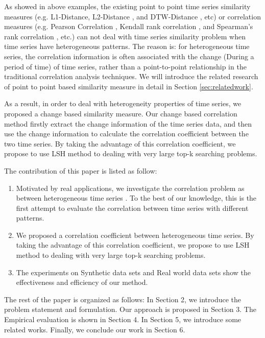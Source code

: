 As showed in above examples, the existing point to point time series similarity measures (e.g. L1-Distance, L2-Distance \cite{han2011data}, and DTW-Distance \cite{muller2007dynamic}, etc) or correlation measures (e.g. Pearson Correlation \cite{pearson1904mathematical}, Kendall rank correlation \cite{kendall1938new}, and Spearman's rank correlation \cite{pirie1988spearman}, etc.) can not deal with time series similarity problem when time series have heterogeneous patterns. 
The reason is: for heterogeneous time series, the correlation information is often associated with the change (During a period of time) of time series, rather than a point-to-point relationship in the traditional correlation analysis techniques. We will introduce the related research of point to point based similarity measure in detail in Section \ref{sec:relatedwork}.

As a result, in order to deal with heterogeneity properties of time series, we proposed a change based similarity measure. 
Our change based correlation method firstly extract the change information of the time series data, and then use the change information to calculate the correlation coefficient between the two time series.
By taking the advantage of this correlation coefficient, we propose to use LSH method to dealing with very large top-k searching problems.

The contribution of this paper is listed as follow:
\begin{enumerate}
\item Motivated by real applications, we investigate the correlation
problem as between heterogeneous time series .
To the best of our knowledge, this is the first attempt
to evaluate the correlation between time series with different patterns.

\item We proposed a correlation coefficient between heterogeneous time series. By taking the advantage of this correlation coefficient, we propose to use LSH method to dealing with very large top-k searching problems.

\item The experiments on Synthetic data sets and Real world data sets show the effectiveness and efficiency of our method.
\end{enumerate}

The rest of the paper is organized as follows: In Section 2, we introduce the problem
statement and formulation. Our approach is proposed in Section 3. The Empirical evaluation is shown in Section 4. In Section 5, we introduce some
related works. Finally, we conclude our work in Section 6.



